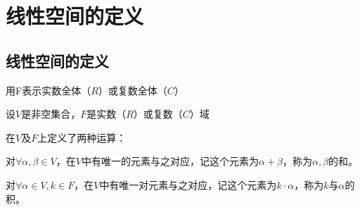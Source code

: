 \section{线性空间的定义}
\subsection{线性空间的定义}
用F表示实数全体（$R$）或复数全体（$C$）

\begin{definition}
    设$V$是非空集合，$F$是实数（$R$）或复数（$C$）域
\end{definition}

在$V$及$F$上定义了两种运算：
\begin{definition}[加法]
    对$\forall\alpha,\beta\in V$，在$V$中有唯一的元素与之对应，记这个元素为$\alpha+\beta$，称为$\alpha,\beta$的和。
\end{definition}
\begin{definition}[数乘]
    对$\forall \alpha \in V, k \in F$，在$V$中有唯一对元素与之对应，记这个元素为$k\cdot\alpha$，称为$k$与$\alpha$的积。
\end{definition}    

